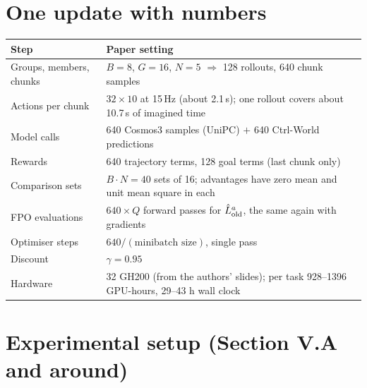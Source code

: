 \section{One update with numbers}
\begin{center}
\small
\begin{tabularx}{\linewidth}{@{}l Y@{}}
\toprule
Step & Paper setting\\
\midrule
Groups, members, chunks & $B=8$, $G=16$, $N=5$ $\Rightarrow$ 128 rollouts, 640 chunk samples\\
Actions per chunk & $32\times10$ at 15\,Hz (about 2.1\,s); one rollout covers about 10.7\,s of imagined time\\
Model calls & 640 Cosmos3 samples (UniPC) $+$ 640 Ctrl-World predictions\\
Rewards & 640 trajectory terms, 128 goal terms (last chunk only)\\
Comparison sets & $B\cdot N=40$ sets of 16; advantages have zero mean and unit mean square in each\\
FPO evaluations & $640\times Q$ forward passes for $\hat L^{a}_{\mathrm{old}}$, the same again with gradients\\
Optimiser steps & $640/(\text{minibatch size})$, single pass\\
Discount & $\gamma=0.95$\\
Hardware & 32 GH200 (from the authors' slides); per task 928--1396 GPU-hours, 29--43 h wall clock\\
\bottomrule
\end{tabularx}
\end{center}

\section{Experimental setup (Section V.A and around)}

